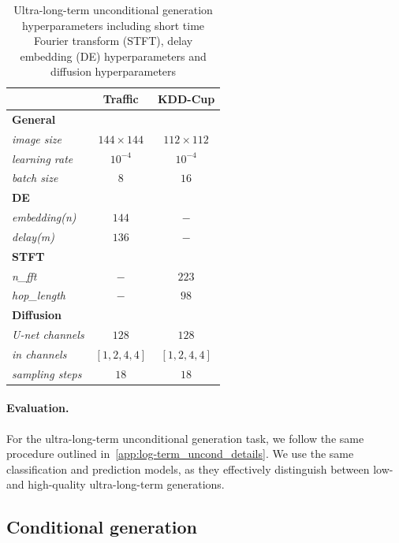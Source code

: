 \documentclass{article}
\begin{document}
\begin{table}[!ht]
    \centering
    \caption{Ultra-long-term unconditional generation hyperparameters including short time Fourier transform (STFT), delay embedding (DE) hyperparameters and diffusion hyperparameters}
    \label{tab:ultra-long_hyper}
    \setlength{\tabcolsep}{8pt} %
    \begin{tabular}{lcc}
        \toprule
        & \textbf{Traffic} & \textbf{KDD-Cup} \\
        \midrule
        \textbf{General} \\
        \emph{image size}  & $144 \times 144 $ & $112 \times 112$ \\
        \emph{learning rate} & $10^{-4}$ & $10^{-4}$  \\
        \emph{batch size} & $8$ & $16$  \\
        \midrule
        \textbf{DE} \\
        \emph{embedding(n)} & $144$ & $-$   \\
        \emph{delay(m)} & $136$ & $-$ \\
        \midrule
        \textbf{STFT} \\
        \emph{n\_fft} & $-$ & $223$  \\
        \emph{hop\_length} & $-$ & $98$ \\
        \midrule
        \textbf{Diffusion} \\
        \emph{U-net channels} & $128$ & $128$   \\
        \emph{in channels} & $[1, 2, 4, 4]$ & $[1, 2, 4, 4]$\\
        \emph{sampling steps} & $18$ & $18$  \\
        \bottomrule
    \end{tabular}
\end{table}

\paragraph{Evaluation.} For the ultra-long-term unconditional generation task, we follow the same procedure outlined in~\ref{app:log-term_uncond_details}. We use the same classification and prediction models, as they effectively distinguish between low- and high-quality ultra-long-term generations.



\subsection{Conditional generation}
\end{document}
